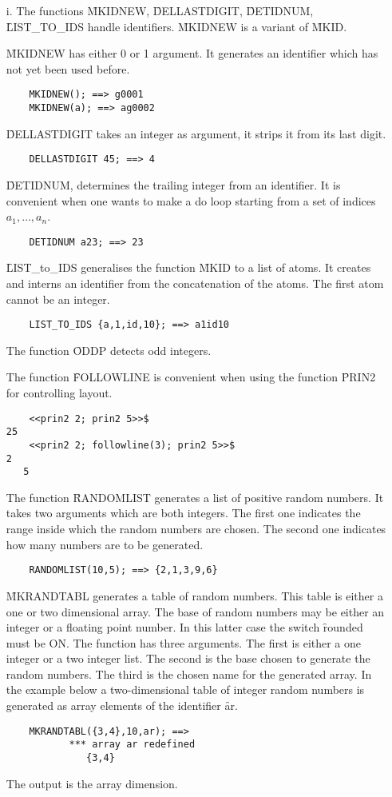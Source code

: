 \begin{itemize}
\item[i.]
The functions \f{MKIDNEW},
\f{DELLASTDIGIT},
\f{DETIDNUM},
\f{LIST\_TO\_IDS}
handle identifiers. \f{MKIDNEW} is a variant of \f{MKID}.

\f{MKIDNEW} has either 0 or 1 argument. It generates an identifier which
has not yet been used before.
\begin{verbatim}
	MKIDNEW(); ==> g0001
	MKIDNEW(a); ==> ag0002
\end{verbatim}
\f{DELLASTDIGIT} takes an integer as argument, it strips it from its last
digit.
\begin{verbatim}
	DELLASTDIGIT 45; ==> 4
\end{verbatim}
\f{DETIDNUM}, determines the trailing integer from an identifier.  It is
convenient when one wants to make a do loop starting from a set of
indices $ a_1, \ldots , a_{n} $.
\begin{verbatim}
	DETIDNUM a23; ==> 23
\end{verbatim}

\f{LIST\_to\_IDS} generalises the function \f{MKID} to a list of
atoms. It creates and interns an identifier from the concatenation of
the atoms. The first atom cannot be an integer.
\begin{verbatim}
	LIST_TO_IDS {a,1,id,10}; ==> a1id10
\end{verbatim}
The function \f{ODDP} detects odd integers.

The function \f{FOLLOWLINE} is convenient when
using the function \f{PRIN2} for controlling layout.
\begin{verbatim}
	<<prin2 2; prin2 5>>$
25
	<<prin2 2; followline(3); prin2 5>>$
2
   5
\end{verbatim}

The function \f{RANDOMLIST} generates a list of
positive random numbers.  It takes
two arguments which are both integers. The first one indicates the range
inside which the random numbers are chosen. The second one indicates how
many numbers are to be generated.
\begin{verbatim}
	RANDOMLIST(10,5); ==> {2,1,3,9,6}
\end{verbatim}
\f{MKRANDTABL} generates a table of random
numbers. This table is either
a one or two dimensional array.  The base of random numbers may be either
an integer or a floating point number. In this latter case
the switch \f{rounded} must be ON.  The function has three
arguments. The first is either a one integer or a two integer
list. The second is the base chosen to generate the random
numbers. The third is the chosen name for the generated array.  In the
example below a two-dimensional table of integer random numbers is
generated as array elements of the identifier {\f ar}.
\begin{verbatim}
	MKRANDTABL({3,4},10,ar); ==>
	       *** array ar redefined
		      {3,4}
\end{verbatim}
The output is the array dimension.


\end{itemize}
